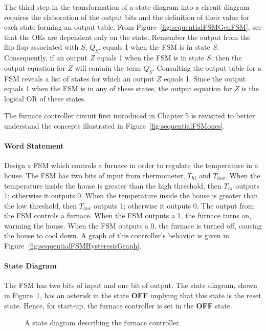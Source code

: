 The third step in the transformation of a state diagram into a circuit
diagram requires the elaboration of the output bits and the definition of their
value for each state forming an output table.  From Figure~\ref{fig:sequentialFSMGenFSM},
see that the OEs are dependent only on the state.  Remember the
output from the flip flop associated with $S$, $Q_S$, equals 1 when the
FSM is in state $S$.  Consequently, if an output $Z$ equals 1 when the
FSM is in state $S$, then the output equation for $Z$ will contain the
term $Q_S$.  Consulting the output table for a FSM reveals a list
of states for which an output $Z$ equals 1.  Since the output equals
1 when the FSM is in any of these states, the output equation for $Z$
is the logical OR of these states.

The furnace controller circuit first introduced in Chapter 5 is
revisited to better understand the concepts illustrated in
Figure~\ref{fig:sequentialFSMones}.


\paragraph{Word Statement}
Design a FSM which controls a furnace in order to regulate the
temperature in a house.  The FSM has two bits of input from thermometer,
$T_{hi}$ and $T_{low}$.  When the temperature inside the house
is greater than the high threshold, then $T_{hi}$ outputs 1; otherwise
it outputs 0.  When the temperature inside the house is greater than
the low threshold, then $T_{low}$ outputs 1; otherwise it outputs 0.
The output from the FSM controls a furnace.  When the FSM outputs a
1, the furnace turns on, warming the house.  When the FSM outputs a 0,
the furnace is turned off, causing the house to cool down.  A graph
of this controller's behavior is given in Figure~\ref{fig:sequentialFSMHysteresisGraph}.

\paragraph{State Diagram}
The FSM has two bits of input and one bit of
output. The state diagram, shown in Figure~\ref{fig:sequentialFSMFurnaceSD}, has
an asterisk in the state \textbf{ OFF} implying that this state is the reset state.
Hence, for start-up, the furnace controller is set in the \textbf{ OFF}
state.

\begin{figure}[ht]
    \caption{A state diagram describing the furnace controller.}
    \label{fig:sequentialFSMFurnaceSD}
\end{figure}

